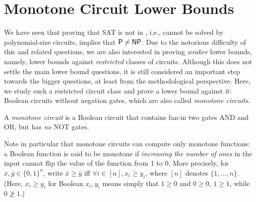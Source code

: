 %
%
%





\chapter{Monotone Circuit Lower Bounds}
\label{sec:Razborov} %



We have  seen that proving that SAT is not in \Ppoly, i.e., cannot  be solved by polynomial-size circuits, implies that ${\mathsf{P}} \neq {\ensuremath{\mathsf{NP}}}$.
Due to the notorious difficulty of this and related questions, we are also interested in proving \emph{weaker} lower bounds, namely, lower bounds against \emph{restricted} classes of circuits. Although this does not settle the main lower bound questions, it is still considered an important step towards the bigger questions, at least from the methodological perspective. 
Here, we study such a restricted circuit class and prove a lower bound against it: Boolean circuits without negation gates, which are also called \emph{ monotone circuits}.

\begin{definition}
A \emph{monotone circuit} is a Boolean circuit that contains fan-in two gates AND and OR, but has \emph{no} NOT gates.
\end{definition}

Note in particular that monotone circuits can compute only monotone functions: a Boolean function is said to be monotone if \emph{increasing the number of ones} in the input cannot flip the value of the function from 1 to 0. More precisely, for $\bar{x}, \bar{y} \in\{0,1\}^n$, write $\bar{x} \geq \bar{y}$ iff $ \forall i \in [n], x_i \geq y_i$, where $[n]$ denotes $\{1,\dots,n\}$. (Here, $x_i\ge y_i$ for Boolean $x_i,y_i$ means simply that $1\ge 0$ and $0\ge 0$, $1\ge 1$, while $0\not\ge 1$.)

